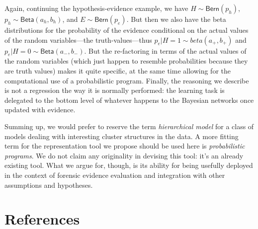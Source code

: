 \documentclass[
  10pt,
  dvipsnames,enabledeprecatedfontcommands]{scrartcl}
\begin{document}
Again, continuing the hypothesis-evidence example, we have
\(H \sim \mathsf{Bern}(p_h)\), \(p_h \sim \mathsf{Beta}(a_h, b_h)\), and
\(E\sim \mathsf{Bern}(p_e)\). But then we also have the beta
distributions for the probability of the evidence conditional on the
actual values of the random variables---the truth-values---thus
\(p_e \vert H = 1 \sim beta(a_{+}, b_{+} )\) and
\(p_e \vert H = 0 \sim \mathsf{Beta}(a_{-}, b_{-})\). But the
re-factoring in terms of the actual values of the random variables
(which just happen to resemble probabilities because they are truth
values) makes it quite specific, at the same time allowing for the
computational use of a probabilistic program. Finally, the reasoning we
describe is not a regression the way it is normally performed: the
learning task is delegated to the bottom level of whatever happens to
the Bayesian networks once updated with evidence.

Summing up, we would prefer to reserve the term
\emph{hierarchical model} for a class of models dealing with interesting
cluster structures in the data. A more fitting term for the
representation tool we propose should be used here is
\emph{probabilistic programs}. We do not claim any originality in
devising this tool: it's an already existing tool. What we argue for,
though, is its ability for being usefully deployed in the context of
forensic evidence evaluation and integration with other assumptions and
hypotheses.

\hypertarget{references}{%
\section*{References}\label{references}}
\end{document}
